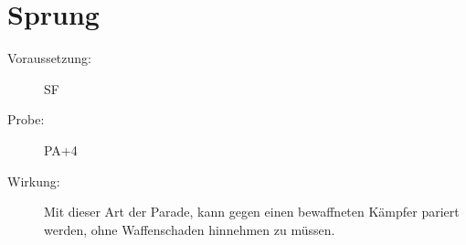 \section{Sprung}
\label{uPA.sprung}
\begin{description}
    \item[Voraussetzung:]
        SF 
    \item[Probe:]
        PA+4
    \item[Wirkung:]
        Mit dieser Art der Parade, kann gegen einen bewaffneten Kämpfer pariert werden, ohne Waffenschaden hinnehmen zu müssen.
\end{description}
